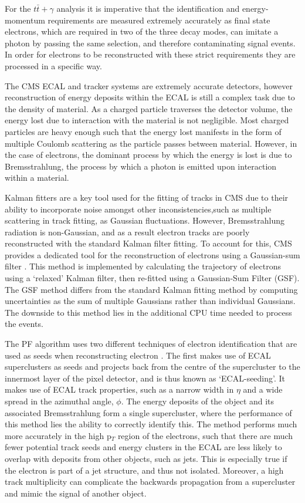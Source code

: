 For the $t\bar{t}+\gamma$ analysis it is imperative that the identification and energy-momentum requirements are measured extremely accurately as final state electrons, which are required in two of the three decay modes, can imitate a photon by passing the same selection, and therefore contaminating signal events. In order for electrons to be reconstructed with these strict requirements they are processed in a specific way.

The CMS ECAL and tracker systems are extremely accurate detectors, however reconstruction of energy deposits within the ECAL is still a complex task due to the density of material. As a charged particle traverses the detector volume, the energy lost due to interaction with the material is not negligible. Most charged particles are heavy enough such that the energy lost manifests in the form of multiple Coulomb scattering as the particle passes between material. However, in the case of electrons, the dominant process by which the energy is lost is due to Bremsstrahlung, the process by which a photon is emitted upon interaction within a material. 

Kalman fitters are a key tool used for the fitting of tracks in CMS due to their ability to incorporate noise amongst other inconsistencies,such as multiple scattering in track fitting, as Gaussian fluctuations. However, Bremsstrahlung radiation is non-Gaussian, and as a result electron tracks are poorly reconstructed with the standard Kalman filter fitting. To account for this, CMS provides a dedicated tool for the reconstruction of electrons using a Gaussian-sum filter \cite{0954-3899-31-9-N01}. This method is implemented by calculating the trajectory of electrons using a `relaxed' Kalman filter, then re-fitted using a Gaussian-Sum Filter (GSF). The GSF method differs from the standard Kalman fitting method by computing uncertainties as the sum of multiple Gaussians rather than individual Gaussians. The downside to this method lies in the additional CPU time needed to process the events. 

The PF algorithm uses two different techniques of electron identification that are used as seeds when reconstructing electron \cite{CMS-PAS-PFT-10-003}. The first makes use of ECAL superclusters as seeds and projects back from the centre of the supercluster to the innermost layer of the pixel detector, and is thus known as `ECAL-seeding'. It makes use of ECAL track properties, such as a narrow width in $\eta$ and a wide spread in the azimuthal angle, $\phi$. The energy deposits of the object and its associated Bremsstrahlung form a single supercluster, where the performance of this method lies the ability to correctly identify this. The method performs much more accurately in the high p$_T$ region of the electrons, such that there are much fewer potential track seeds and energy clusters in the ECAL are less likely to overlap with deposits from other objects, such as jets. This is especially true if the electron is part of a jet structure, and thus not isolated. Moreover, a high track multiplicity can complicate the backwards propagation from a supercluster and mimic the signal of another object.

